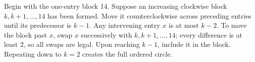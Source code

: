 Begin with the one-entry block 14. Suppose an increasing clockwise block $k,k+1,\ldots,14$ has been formed. Move it counterclockwise across preceding entries until its predecessor is $k-1$. Any intervening entry $x$ is at most $k-2$. To move the block past $x$, swap $x$ successively with $k,k+1,\ldots,14$; every difference is at least 2, so all swaps are legal. Upon reaching $k-1$, include it in the block. Repeating down to $k=2$ creates the full ordered circle.
